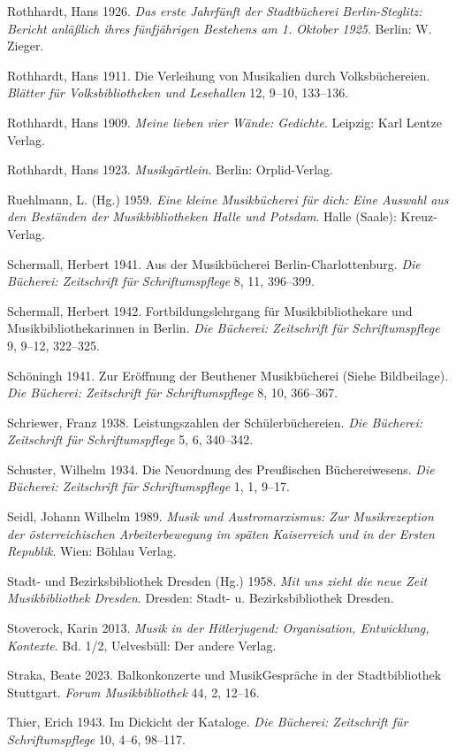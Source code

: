 \documentclass[a4paper,
fontsize=11pt,
oneside,
numbers=noperiodatend,
parskip=half-,
bibliography=totoc,
final
]{scrartcl}
\begin{document}
Rothhardt, Hans 1926. \emph{Das erste Jahrfünft der Stadtbücherei
Berlin-Steglitz: Bericht anläßlich ihres fünfjährigen Bestehens am 1.
Oktober 1925}. Berlin: W. Zieger.

Rothhardt, Hans 1911. Die Verleihung von Musikalien durch
Volksbüchereien. \emph{Blätter für Volksbibliotheken und Lesehallen} 12,
9--10, 133--136.

Rothhardt, Hans 1909. \emph{Meine lieben vier Wände: Gedichte}. Leipzig:
Karl Lentze Verlag.

Rothhardt, Hans 1923. \emph{Musikgärtlein}. Berlin: Orplid-Verlag.

Ruehlmann, L. (Hg.) 1959. \emph{Eine kleine Musikbücherei für dich: Eine
Auswahl aus den Beständen der Musikbibliotheken Halle und Potsdam}.
Halle (Saale): Kreuz-Verlag.

Schermall, Herbert 1941. Aus der Musikbücherei Berlin-Charlottenburg.
\emph{Die Bücherei: Zeitschrift für Schriftumspflege} 8, 11, 396--399.

Schermall, Herbert 1942. Fortbildungslehrgang für Musikbibliothekare und
Musikbibliothekarinnen in Berlin. \emph{Die Bücherei: Zeitschrift für
Schriftumspflege} 9, 9--12, 322--325.

Schöningh 1941. Zur Eröffnung der Beuthener Musikbücherei (Siehe
Bildbeilage). \emph{Die Bücherei: Zeitschrift für Schriftumspflege} 8,
10, 366--367.

Schriewer, Franz 1938. Leistungszahlen der Schülerbüchereien. \emph{Die
Bücherei: Zeitschrift für Schriftumspflege} 5, 6, 340--342.

Schuster, Wilhelm 1934. Die Neuordnung des Preußischen Büchereiwesens.
\emph{Die Bücherei: Zeitschrift für Schriftumspflege} 1, 1, 9--17.

Seidl, Johann Wilhelm 1989. \emph{Musik und Austromarxismus: Zur
Musikrezeption der österreichischen Arbeiterbewegung im späten
Kaiserreich und in der Ersten Republik}. Wien: Böhlau Verlag.

Stadt- und Bezirksbibliothek Dresden (Hg.) 1958. \emph{Mit uns zieht die
neue Zeit Musikbibliothek Dresden}. Dresden: Stadt- u. Bezirksbibliothek
Dresden.

Stoverock, Karin 2013. \emph{Musik in der Hitlerjugend: Organisation,
Entwicklung, Kontexte}. Bd. 1/2, Uelvesbüll: Der andere Verlag.

Straka, Beate 2023. Balkonkonzerte und MusikGespräche in der
Stadtbibliothek Stuttgart. \emph{Forum Musikbibliothek} 44, 2, 12--16.

Thier, Erich 1943. Im Dickicht der Kataloge. \emph{Die Bücherei:
Zeitschrift für Schriftumspflege} 10, 4--6, 98--117.
\end{document}

